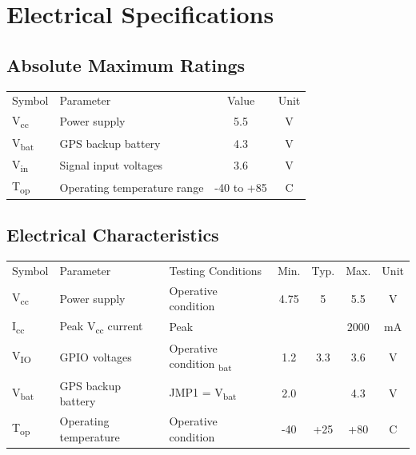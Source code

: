 \documentclass[12pt,article]{memoir}
\begin{document}
\newpage

\chapter{Electrical Specifications}
\section{Absolute Maximum Ratings}
\begin{tabularx}{\textwidth}{|l|X|c|c|}
	\hline
	Symbol & Parameter & Value  & Unit\\\hhline{|=|=|=|=|}
	V\textsubscript{cc} & Power supply & 5.5 & V\\\hline
	V\textsubscript{bat} & GPS backup battery & 4.3 & V\\\hline
	V\textsubscript{in} & Signal input voltages & 3.6 & V\\\hline
	T\textsubscript{op} & Operating temperature range & -40 to +85 & \textdegree{}C\\\hline
\end{tabularx}
\section{Electrical Characteristics}
\begin{tabularx}{\textwidth}{|l|X|X|c|c|c|c|}
	\hline
	Symbol & Parameter & Testing Conditions & Min. &Typ. & Max. &Unit\\\hhline{|=|=|=|=|=|=|=|}
	V\textsubscript{cc} & Power supply & Operative condition & 4.75 & 5 & 5.5 & V\\ \hline
	I\textsubscript{cc} & Peak V\textsubscript{cc} current & Peak & & & 2000 & mA\\ \hline
	V\textsubscript{IO} & GPIO voltages & Operative condition \textsubscript{bat} & 1.2 & 3.3 & 3.6 & V \\ \hline
	V\textsubscript{bat} & GPS backup battery & JMP1 = V\textsubscript{bat} & 2.0 & & 4.3 & V \\ \hline
	T\textsubscript{op} & Operating temperature & Operative condition  & -40 & +25 & +80 & \textdegree{}C \\ \hline
\end{tabularx}

\clearpage
\end{document}
